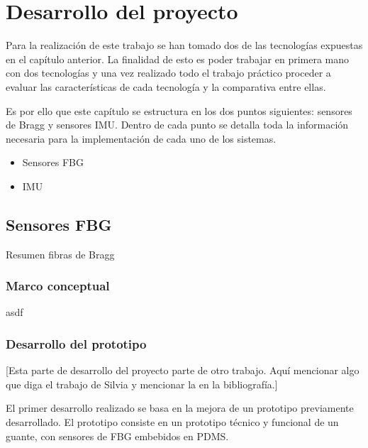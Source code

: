 \chapter{Desarrollo del proyecto\label{sec:disenho}}

Para la realización de este trabajo se han tomado dos  de las tecnologías expuestas en el capítulo anterior. %
La finalidad de esto es poder trabajar en primera mano con dos tecnologías y una vez realizado todo el trabajo práctico proceder a evaluar las características de cada tecnología y la comparativa entre ellas.

Es por ello que este capítulo se estructura en los dos puntos siguientes: sensores de Bragg y sensores IMU. Dentro de cada punto se detalla toda la información necesaria para la implementación de cada uno de los sistemas.\cite{SilviaTFM}

\begin{itemize}
	\item {Sensores FBG}
	\item {IMU}
\end{itemize}


\section{Sensores FBG}
\label{sec:FBG3}

Resumen fibras de Bragg


\subsection{Marco conceptual}
\label{sec:mc3FBG}
asdf

\subsection{Desarrollo del prototipo}
\label{sec:prot3FBG}
[Esta parte de desarrollo del proyecto parte de otro trabajo. Aquí mencionar algo que diga el trabajo de Silvia y mencionar la en la bibliografía.]

El primer desarrollo realizado se basa en la mejora de un prototipo previamente desarrollado. El prototipo consiste en un prototipo técnico y funcional de un guante, con sensores de FBG embebidos en PDMS. \cite{SilviaTFM}



